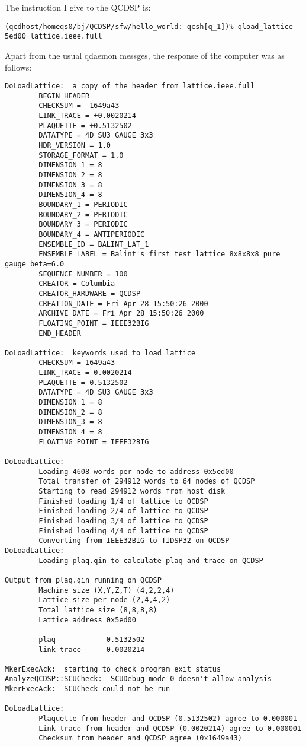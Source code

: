 The instruction I give to the QCDSP is:
\begin{verbatim}
(qcdhost/homeqs0/bj/QCDSP/sfw/hello_world: qcsh[q_1])% qload_lattice 5ed00 lattice.ieee.full
\end{verbatim}
Apart from the usual qdaemon messges, the response of the computer was 
as follows:
{\scriptsize
\begin{verbatim}
DoLoadLattice:  a copy of the header from lattice.ieee.full
        BEGIN_HEADER
        CHECKSUM =  1649a43
        LINK_TRACE = +0.0020214
        PLAQUETTE = +0.5132502
        DATATYPE = 4D_SU3_GAUGE_3x3
        HDR_VERSION = 1.0
        STORAGE_FORMAT = 1.0
        DIMENSION_1 = 8
        DIMENSION_2 = 8
        DIMENSION_3 = 8
        DIMENSION_4 = 8
        BOUNDARY_1 = PERIODIC
        BOUNDARY_2 = PERIODIC
        BOUNDARY_3 = PERIODIC
        BOUNDARY_4 = ANTIPERIODIC
        ENSEMBLE_ID = BALINT_LAT_1
        ENSEMBLE_LABEL = Balint's first test lattice 8x8x8x8 pure gauge beta=6.0
        SEQUENCE_NUMBER = 100
        CREATOR = Columbia
        CREATOR_HARDWARE = QCDSP 
        CREATION_DATE = Fri Apr 28 15:50:26 2000
        ARCHIVE_DATE = Fri Apr 28 15:50:26 2000
        FLOATING_POINT = IEEE32BIG
        END_HEADER

DoLoadLattice:  keywords used to load lattice
        CHECKSUM = 1649a43
        LINK_TRACE = 0.0020214
        PLAQUETTE = 0.5132502
        DATATYPE = 4D_SU3_GAUGE_3x3
        DIMENSION_1 = 8
        DIMENSION_2 = 8
        DIMENSION_3 = 8
        DIMENSION_4 = 8
        FLOATING_POINT = IEEE32BIG

DoLoadLattice:
        Loading 4608 words per node to address 0x5ed00
        Total transfer of 294912 words to 64 nodes of QCDSP
        Starting to read 294912 words from host disk
        Finished loading 1/4 of lattice to QCDSP
        Finished loading 2/4 of lattice to QCDSP
        Finished loading 3/4 of lattice to QCDSP
        Finished loading 4/4 of lattice to QCDSP
        Converting from IEEE32BIG to TIDSP32 on QCDSP
DoLoadLattice:
        Loading plaq.qin to calculate plaq and trace on QCDSP

Output from plaq.qin running on QCDSP
        Machine size (X,Y,Z,T) (4,2,2,4)
        Lattice size per node (2,4,4,2)
        Total lattice size (8,8,8,8)
        Lattice address 0x5ed00

        plaq            0.5132502
        link trace      0.0020214

MkerExecAck:  starting to check program exit status
AnalyzeQCDSP::SCUCheck:  SCUDebug mode 0 doesn't allow analysis
MkerExecAck:  SCUCheck could not be run

DoLoadLattice:
        Plaquette from header and QCDSP (0.5132502) agree to 0.000001
        Link trace from header and QCDSP (0.0020214) agree to 0.000001
        Checksum from header and QCDSP agree (0x1649a43)
\end{verbatim}}
